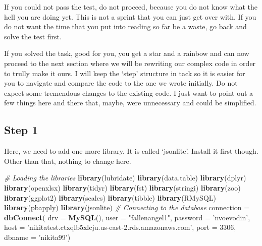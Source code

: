 \documentclass[]{book}
\newenvironment{Shaded}{\begin{snugshade}}{\end{snugshade}}
\newcommand{\CommentTok}[1]{\textcolor[rgb]{0.56,0.35,0.01}{\textit{#1}}}
\newcommand{\DataTypeTok}[1]{\textcolor[rgb]{0.13,0.29,0.53}{#1}}
\newcommand{\DecValTok}[1]{\textcolor[rgb]{0.00,0.00,0.81}{#1}}
\newcommand{\KeywordTok}[1]{\textcolor[rgb]{0.13,0.29,0.53}{\textbf{#1}}}
\newcommand{\NormalTok}[1]{#1}
\newcommand{\StringTok}[1]{\textcolor[rgb]{0.31,0.60,0.02}{#1}}
\begin{document}
If you could not pass the test, do not proceed, because you do not know what the hell you are doing yet. This is not a sprint that you can just get over with. If you do not want the time that you put into reading so far be a waste, go back and solve the test first.

If you solved the task, good for you, you get a star and a rainbow and can now proceed to the next section where we will be rewriting our complex code in order to trully make it ours. I will keep the `step' structure in tack so it is easier for you to navigate and compare the code to the one we wrote initially. Do not expect some tremendous changes to the existing code. I just want to point out a few things here and there that, maybe, were unnecessary and could be simplified.

\hypertarget{step-1-2}{%
\subsection{Step 1}\label{step-1-2}}

Here, we need to add one more library. It is called `jsonlite'. Install it first though. Other than that, nothing to change here.

\begin{Shaded}
\begin{Highlighting}[]
\CommentTok{# Loading the libraries}
    \KeywordTok{library}\NormalTok{(lubridate) }
    \KeywordTok{library}\NormalTok{(data.table) }
    \KeywordTok{library}\NormalTok{(dplyr) }
    \KeywordTok{library}\NormalTok{(openxlsx) }
    \KeywordTok{library}\NormalTok{(tidyr) }
    \KeywordTok{library}\NormalTok{(fst) }
    \KeywordTok{library}\NormalTok{(stringi)}
    \KeywordTok{library}\NormalTok{(zoo) }
    \KeywordTok{library}\NormalTok{(ggplot2) }
    \KeywordTok{library}\NormalTok{(scales) }
    \KeywordTok{library}\NormalTok{(tibble) }
    \KeywordTok{library}\NormalTok{(RMySQL)}
    \KeywordTok{library}\NormalTok{(pbapply)}
    \KeywordTok{library}\NormalTok{(jsonlite)}
\CommentTok{# Connecting to the database}
\NormalTok{connection =}\StringTok{ }\KeywordTok{dbConnect}\NormalTok{(}
  \DataTypeTok{drv =} \KeywordTok{MySQL}\NormalTok{(), }
  \DataTypeTok{user =} \StringTok{"fallenangel1"}\NormalTok{, }
  \DataTypeTok{password =} \StringTok{'nvoevodin'}\NormalTok{, }
  \DataTypeTok{host =} \StringTok{'nikitatest.ctxqlb5xlcju.us-east-2.rds.amazonaws.com'}\NormalTok{, }
  \DataTypeTok{port =} \DecValTok{3306}\NormalTok{, }
  \DataTypeTok{dbname =} \StringTok{'nikita99'}\NormalTok{)}
\end{Highlighting}
\end{Shaded}
\end{document}
